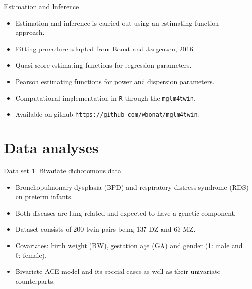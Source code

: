 \documentclass[
  ignorenonframetext,
  serif,
  professionalfont,
  usenames,
  dvipsnames,
  aspectratio = 169]{beamer}
\providecommand{\tightlist}{%
  \setlength{\itemsep}{0pt}\setlength{\parskip}{0pt}}
\renewcommand{\tightlist}{%
  \setlength{\itemsep}{0\baselineskip}
  \setlength{\parskip}{0.25\baselineskip}
}
\begin{document}
\begin{frame}{Estimation and Inference}
\protect\hypertarget{estimation-and-inference-1}{}
\begin{itemize}
\tightlist
\item
  Estimation and inference is carried out using an estimating function
  approach.
\item
  Fitting procedure adapted from Bonat and J\o rgensen, 2016.
\item
  Quasi-score estimating functions for regression parameters.
\item
  Pearson estimating functions for power and dispersion parameters.
\item
  Computational implementation in \texttt{R} through the
  \texttt{mglm4twin}.
\item
  Available on github \texttt{https://github.com/wbonat/mglm4twin}.
\end{itemize}
\end{frame}

\hypertarget{data-analyses}{%
\section{Data analyses}\label{data-analyses}}

\begin{frame}{Data set 1: Bivariate dichotomous data}
\protect\hypertarget{data-set-1-bivariate-dichotomous-data}{}
\begin{itemize}
\tightlist
\item
  Bronchopulmonary dysplasia (BPD) and respiratory distress syndrome
  (RDS) on preterm infants.
\item
  Both diseases are lung related and expected to have a genetic
  component.
\item
  Dataset consists of \(200\) twin-pairs being \(137\) DZ and \(63\) MZ.
\item
  Covariates: birth weight (BW), gestation age (GA) and gender (1: male
  and 0: female).
\item
  Bivariate ACE model and its special cases as well as their univariate
  counterparts.
\end{itemize}
\end{frame}
\end{document}
